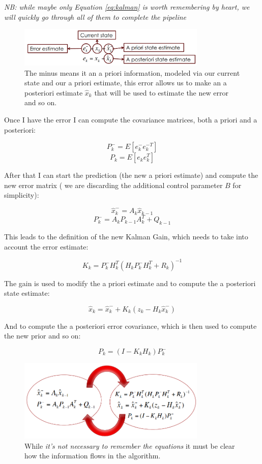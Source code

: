 \textit{NB: while maybe only Equation \ref{eq:kalman} is worth remembering by heart, we will quickly go through all of them to complete the pipeline}
\begin{figure}[H]
    \centering
    \includegraphics[width=0.8\textwidth]{Figures/prior.png}
    \caption{The minus means it an a priori information, modeled via our current state and our a priori estimate, this error allows us to make an a posteriori estimate $\hat{x}_k$ that will be used to estimate the new error and so on.}
    \label{img:prior}
\end{figure}

Once I have the error I can compute the covariance matrices, both a priori and a posteriori:

\[
    P^-_k = E[e^-_ke^{-T}_k]
\]
\[
    P_k = E[e_ke^T_k]
\]

After that I can start the prediction (the new a priori estimate) and compute the new error matrix ( we are discarding the additional control parameter $B$ for simplicity):

\[
    \hat{x}^-_k = A_k\hat{x}_{k-1}
\]
\[
    P^-_k = A_kP_{k-1}A^T_k+Q_{k-1}
\]

This leads to the definition of the new Kalman Gain, which needs to take into account the error estimate:

\[
    K_k = P^-_kH^T_k(H_kP^-_kH^T_k+R_k)^{-1}    
\]

The gain is used to modify the a priori estimate and to compute the a posteriori state estimate:

\[
    \hat{x}_k = \hat{x}^-_k+K_k(z_k-H_k\hat{x}^-_k)
\]

And to compute the a posteriori error covariance, which is then used to compute the new prior and so on:

\[
    P_k = (I-K_kH_k)P^-_k    
\]

\begin{figure}[H]
    \centering
    \includegraphics[width=0.8\textwidth]{Figures/loop.png}
    \caption{While \textit{it's not necessary to remember the equations} it must be clear how the information flows in the algorithm.}
    \label{img:loop}
\end{figure}

